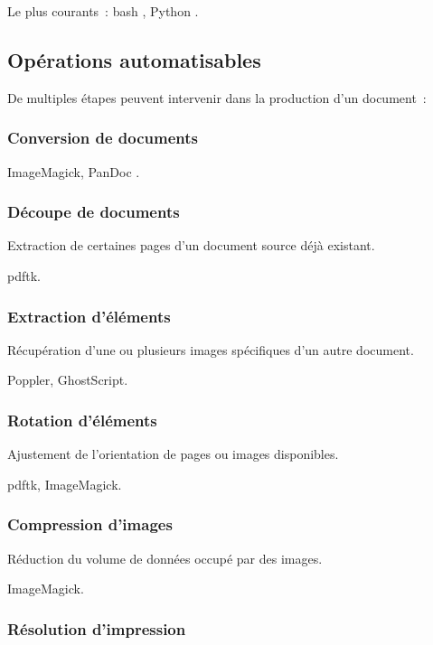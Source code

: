 Le plus courants : \gls{bash} \cite{bash}, Python \cite{py}.

\pagebreak

\subsection{Opérations automatisables}

De multiples étapes peuvent intervenir dans la production d’un document :

\subsubsection{Conversion de documents}

ImageMagick, PanDoc \cite{pandoc}.

\subsubsection{Découpe de documents}

Extraction de certaines pages d’un document source déjà existant.

\gls{pdftk}.

\subsubsection{Extraction d’éléments}

Récupération d’une ou plusieurs images spécifiques d’un autre document.

Poppler, GhostScript.

\subsubsection{Rotation d’éléments}

Ajustement de l’orientation de pages ou images disponibles.

\gls{pdftk}, ImageMagick.

\subsubsection{Compression d’images}

Réduction du volume de données occupé par des images.

ImageMagick.

\subsubsection{Résolution d’impression}

